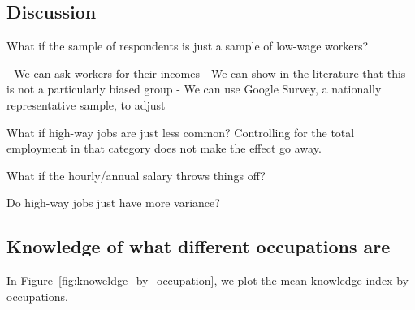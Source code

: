 \documentclass[11pt]{article}
\begin{document}
\subsection{Discussion} 
What if the sample of respondents is just a sample of low-wage workers? 

- We can ask workers for their incomes 
- We can show in the literature that this is not a particularly biased group 
- We can use Google Survey, a nationally representative sample, to adjust 

What if high-way jobs are just less common?
Controlling for the total employment in that category does not make the effect go away. 

What if the hourly/annual salary throws things off? 

Do high-way jobs just have more variance? 

\subsection{Knowledge of what different occupations are} 

In Figure~\ref{fig:knoweldge_by_occupation}, we plot the mean knowledge index by occupations.  
\end{document}
